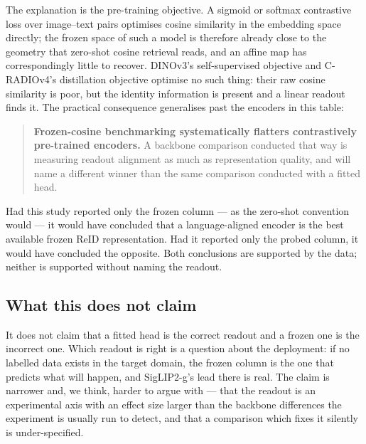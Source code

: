 The explanation is the pre-training objective. A sigmoid or softmax contrastive loss over
image--text pairs optimises cosine similarity in the embedding space directly; the frozen space
of such a model is therefore already close to the geometry that zero-shot cosine retrieval
reads, and an affine map has correspondingly little to recover. DINOv3's self-supervised
objective and C-RADIOv4's distillation objective optimise no such thing: their raw cosine
similarity is poor, but the identity information is present and a linear readout finds it. The
practical consequence generalises past the encoders in this table:

\begin{quote}
\textbf{Frozen-cosine benchmarking systematically flatters contrastively pre-trained encoders.}
A backbone comparison conducted that way is measuring readout alignment as much as
representation quality, and will name a different winner than the same comparison conducted
with a fitted head.
\end{quote}

Had this study reported only the frozen column --- as the zero-shot convention would --- it
would have concluded that a language-aligned encoder is the best available frozen ReID
representation. Had it reported only the probed column, it would have concluded the opposite.
Both conclusions are supported by the data; neither is supported without naming the readout.

\subsection{What this does not claim}
It does not claim that a fitted head is the correct readout and a frozen one is the incorrect
one. Which readout is right is a question about the deployment: if no labelled data exists in
the target domain, the frozen column is the one that predicts what will happen, and SigLIP2-g's
lead there is real. The claim is narrower and, we think, harder to argue with --- that the
readout is an experimental axis with an effect size larger than the backbone differences the
experiment is usually run to detect, and that a comparison which fixes it silently is
under-specified.

